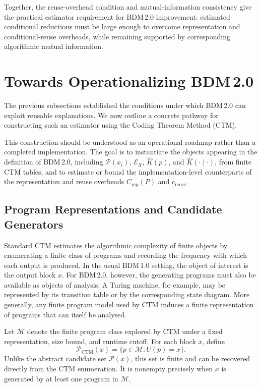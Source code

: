 \documentclass{article}
\begin{document}
Together, the reuse-overhead condition and mutual-information consistency give the practical estimator requirement for BDM\,2.0 improvement: estimated conditional reductions must be large enough to overcome representation and conditional-reuse overheads, while remaining supported by corresponding algorithmic mutual information.

\section[Towards Operationalizing BDM 2.0]{Towards Operationalizing BDM\,2.0}

The previous subsections established the conditions under which BDM\,2.0 can exploit reusable explanations. We now outline a concrete pathway for constructing such an estimator using the Coding Theorem Method (CTM).

This construction should be understood as an operational roadmap rather than a completed implementation. The goal is to instantiate the objects appearing in the definition of BDM\,2.0, including \(\mathcal P(x_i)\), \(\mathcal E_X\), \(\hat K(p)\), and \(\hat K(\cdot\mid\cdot)\), from finite CTM tables, and to estimate or bound the implementation-level counterparts of the representation and reuse overheads \(C_{\mathrm{rep}}(P)\) and \(c_{\mathrm{reuse}}\). 

\subsection{Program Representations and Candidate Generators}

Standard CTM estimates the algorithmic complexity of finite objects by enumerating a finite class of programs and recording the frequency with which each output is produced. In the usual BDM\,1.0 setting, the object of interest is the output block \(x\). For BDM\,2.0, however, the generating programs must also be available as objects of analysis. A Turing machine, for example, may be represented by its transition table or by the corresponding state diagram. More generally, any finite program model used by CTM induces a finite representation of programs that can itself be analysed.

Let \(\mathcal M\) denote the finite program class explored by CTM under a fixed representation, size bound, and runtime cutoff. For each block \(x\), define
\[
\mathcal P_{\mathrm{CTM}}(x)
=
\{p\in\mathcal M:U(p)=x\}.
\]
Unlike the abstract candidate set \(\mathcal P(x)\), this set is finite and can be recovered directly from the CTM enumeration. It is nonempty precisely when \(x\) is generated by at least one program in \(\mathcal M\).
\end{document}
